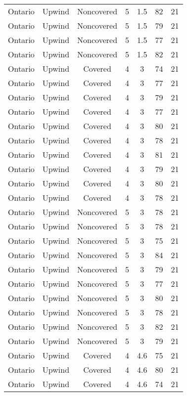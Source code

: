 \documentclass{article}
\begin{document}
\begin{longtable}[H]{ccccccc}
Ontario & Upwind   & Noncovered & 5 & 1.5  & 82  & 21 \\
Ontario & Upwind   & Noncovered & 5 & 1.5  & 79  & 21 \\
Ontario & Upwind   & Noncovered & 5 & 1.5  & 77  & 21 \\
Ontario & Upwind   & Noncovered & 5 & 1.5  & 82  & 21 \\
Ontario & Upwind   & Covered     & 4 & 3    & 74  & 21 \\
Ontario & Upwind   & Covered     & 4 & 3    & 77  & 21 \\
Ontario & Upwind   & Covered     & 4 & 3    & 79  & 21 \\
Ontario & Upwind   & Covered     & 4 & 3    & 77  & 21 \\
Ontario & Upwind   & Covered     & 4 & 3    & 80  & 21 \\
Ontario & Upwind   & Covered     & 4 & 3    & 78  & 21 \\
Ontario & Upwind   & Covered     & 4 & 3    & 81  & 21 \\
Ontario & Upwind   & Covered     & 4 & 3    & 79  & 21 \\
Ontario & Upwind   & Covered     & 4 & 3    & 80  & 21 \\
Ontario & Upwind   & Covered     & 4 & 3    & 78  & 21 \\
Ontario & Upwind   & Noncovered & 5 & 3    & 78  & 21 \\
Ontario & Upwind   & Noncovered & 5 & 3    & 78  & 21 \\
Ontario & Upwind   & Noncovered & 5 & 3    & 75  & 21 \\
Ontario & Upwind   & Noncovered & 5 & 3    & 84  & 21 \\
Ontario & Upwind   & Noncovered & 5 & 3    & 79  & 21 \\
Ontario & Upwind   & Noncovered & 5 & 3    & 77  & 21 \\
Ontario & Upwind   & Noncovered & 5 & 3    & 80  & 21 \\
Ontario & Upwind   & Noncovered & 5 & 3    & 78  & 21 \\
Ontario & Upwind   & Noncovered & 5 & 3    & 82  & 21 \\
Ontario & Upwind   & Noncovered & 5 & 3    & 79  & 21 \\
Ontario & Upwind   & Covered     & 4 & 4.6  & 75  & 21 \\
Ontario & Upwind   & Covered     & 4 & 4.6  & 80  & 21 \\
Ontario & Upwind   & Covered     & 4 & 4.6  & 74  & 21 \\

\end{longtable}
\end{document}
